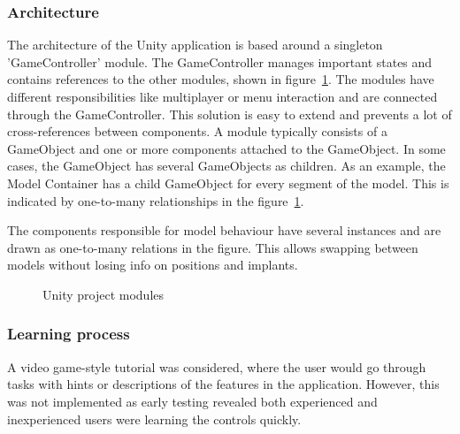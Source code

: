 \documentclass[a4paper]{report}
\begin{document}
\subsubsection{Architecture}
The architecture of the Unity application is based around a singleton 'GameController' module. The GameController manages important states and contains references to the other modules, shown in figure~\ref{structure}. The modules have different responsibilities like multiplayer or menu interaction and are connected through the GameController. This solution is easy to extend and prevents a lot of cross-references between components.
A module typically consists of a GameObject and one or more components attached to the GameObject. In some cases, the GameObject has several GameObjects as children.
As an example, the Model Container has a child GameObject for every segment of the model. This is indicated by one-to-many relationships in the figure~\ref{structure}.

The components responsible for model behaviour have several instances and are drawn as one-to-many relations in the figure. This allows swapping between models without losing info on positions and implants.

\begin{figure}[h!]
    \centering

	\hfill
  \caption{Unity project modules}\label{structure}
  \small

\end{figure}

\subsubsection{Learning process}
A video game-style tutorial was considered, where the user would go through tasks with hints or descriptions of the features in the application. However, this was not implemented as early testing revealed both experienced and inexperienced users were learning the controls quickly.
\end{document}
